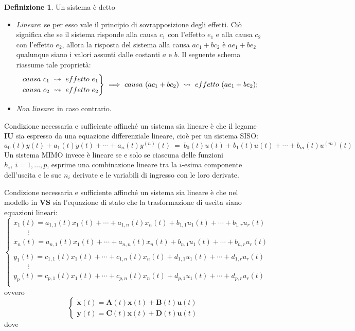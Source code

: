 \documentclass[a4paper]{article}
\renewcommand{\vec}{\bm}
\theoremstyle{definition}
\newtheorem{defn}{Definizione}[section]
\begin{document}
			\begin{defn}
				Un sistema è detto
				\begin{itemize}
					\item \textit{Lineare}: se per esso vale il principio di sovrapposizione degli effetti. Ciò significa che se il sistema risponde alla causa $ c_1 $ con l'effetto $ e_1 $ e alla causa $ c_2 $ con l'effetto $ e_2 $, allora la risposta del sistema alla causa $ ac_1 + bc_2 $ è $ ae_1 + be_2 $ qualunque siano i valori assunti dalle costanti $ a $ e $ b $.
					Il seguente schema riassume tale proprietà:
					\[
						\begin{rcases*}
							causa\ c_1\ \rightsquigarrow\ effetto\ e_1 \\
							causa\ c_2\ \rightsquigarrow\ effetto\ e_2
						\end{rcases*}
						\
						\Longrightarrow
						\
						causa\ (ac_1 + bc_2)\ \rightsquigarrow\ effetto\ (ae_1 + be_2);
					\]
					\item \textit{Non lineare}: in caso contrario.
				\end{itemize}
			\end{defn}
			
		Condizione necessaria e sufficiente affinché un sistema sia lineare è che il legame \textbf{IU} sia espresso da una equazione differenziale	lineare, cioè per un sistema SISO:
		\[
			a_0(t) y(t) + a_1(t)\dot{y}(t) + \cdots + a_n(t) y^{(n)}(t)\ =\
			b_0(t) u(t) + b_1(t)\dot{u}(t) + \cdots + b_m(t)u^{(m)}(t)
		\]
		Un sistema MIMO invece è lineare se e solo se ciascuna delle funzioni $ h_i,\ i = 1,\dots , p $, esprime una combinazione lineare tra la $ i$-esima componente dell’uscita e le sue $ n_i $ derivate e le variabili di ingresso con le loro derivate.
		
		\bigskip
		
		Condizione necessaria e sufficiente affinché un
		sistema sia lineare è che nel modello in \textbf{VS} sia l’equazione di stato che la trasformazione di uscita siano equazioni lineari:
		\[
			\begin{cases}
				\dot{x}_1(t) = a_{1,1}(t) x_1(t) + \cdots + a_{1,n}(t) x_n(t) + b_{1,1} u_1(t) + \cdots + b_{1,r} u_r(t) \\
				\qquad\vdots \\
				\dot{x}_n(t) = a_{n,1}(t) x_1(t) + \cdots + a_{n,n}(t) x_n(t) + b_{n,1} u_1(t) + \cdots + b_{n,r} u_r(t) \\ \\
				y_1(t) = c_{1,1}(t) x_1(t) + \cdots + c_{1,n}(t) x_n(t) + d_{1,1} u_1(t) + \cdots + d_{1,r} u_r(t) \\
				\qquad\vdots \\
				y_p(t) = c_{p,1}(t) x_1(t) + \cdots + c_{p,n}(t) x_n(t) + d_{p,1} u_1(t) + \cdots + d_{p,r} u_r(t) \\
			\end{cases}
		\]
		ovvero
		\[
			\begin{cases}
				\vec{\dot{x}}(t) = \vec{A}(t)\vec{x}(t) + \vec{B}(t)\vec{u}(t) \\
				\vec{y}(t) = \vec{C}(t)\vec{x}(t) + \vec{D}(t)\vec{u}(t)
			\end{cases}
		\]
		dove
		
\end{document}
